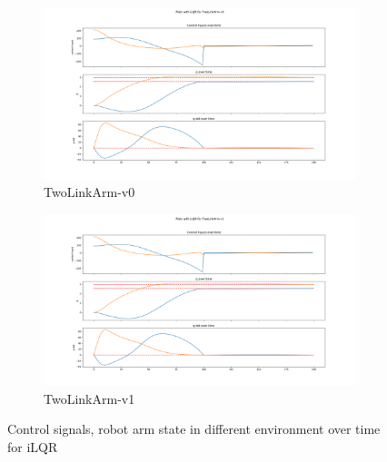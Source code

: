 \documentclass[hidelinks]{scrartcl}
\begin{document}
\begin{figure}[H]
	\centering
    \begin{subfigure}[b]{0.45\textwidth}
        \includegraphics[width=\textwidth]{figures/ilqr_two_link-v0}
        \caption{TwoLinkArm-v0}
    \end{subfigure}
    \begin{subfigure}[b]{0.45\textwidth}
        \includegraphics[width=\textwidth]{figures/ilqr_two_link-v1}
        \caption{TwoLinkArm-v1}
    \end{subfigure}
    \caption{Control signals, robot arm state in different environment over time for iLQR}\label{fig:iLQR_state}
\end{figure}
\end{document}

